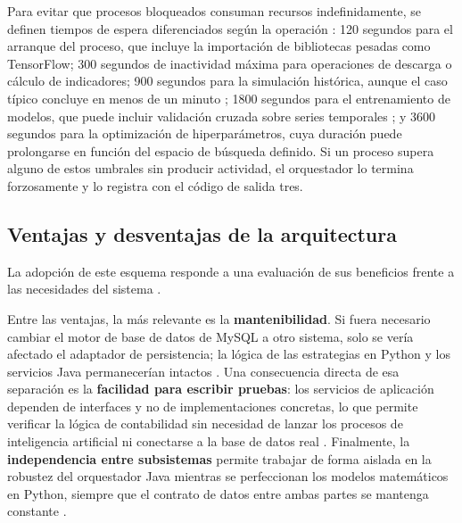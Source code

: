 Para evitar que procesos bloqueados consuman recursos indefinidamente, se definen tiempos de espera diferenciados según la operación \parencite{kleppmann_designing_2017}: 120 segundos para el arranque del proceso, que incluye la importación de bibliotecas pesadas como TensorFlow; 300 segundos de inactividad máxima para operaciones de descarga o cálculo de indicadores; 900 segundos para la simulación histórica, aunque el caso típico concluye en menos de un minuto \parencite{pardo_evaluation_2008}; 1800 segundos para el entrenamiento de modelos, que puede incluir validación cruzada sobre series temporales \parencite{lopez_de_prado_advances_2018}; y 3600 segundos para la optimización de hiperparámetros, cuya duración puede prolongarse en función del espacio de búsqueda definido. Si un proceso supera alguno de estos umbrales sin producir actividad, el orquestador lo termina forzosamente y lo registra con el código de salida tres.

\subsection{Ventajas y desventajas de la arquitectura}

La adopción de este esquema responde a una evaluación de sus beneficios frente a las necesidades del sistema \parencite{treleaven_algorithmic_2013}.

Entre las ventajas, la más relevante es la \textbf{mantenibilidad}. Si fuera necesario cambiar el motor de base de datos de MySQL a otro sistema, solo se vería afectado el adaptador de persistencia; la lógica de las estrategias en Python y los servicios Java permanecerían intactos \parencite{spring_data_jpa_2024,martin_clean_architecture_2017}. Una consecuencia directa de esa separación es la \textbf{facilidad para escribir pruebas}: los servicios de aplicación dependen de interfaces y no de implementaciones concretas, lo que permite verificar la lógica de contabilidad sin necesidad de lanzar los procesos de inteligencia artificial ni conectarse a la base de datos real \parencite{martin_clean_architecture_2017,evans_domain_driven_2003}. Finalmente, la \textbf{independencia entre subsistemas} permite trabajar de forma aislada en la robustez del orquestador Java mientras se perfeccionan los modelos matemáticos en Python, siempre que el contrato de datos entre ambas partes se mantenga constante \parencite{hilpisch_python_2018,newman_building_2015}.


